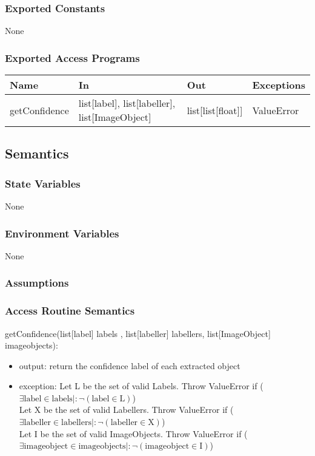 \documentclass[12pt, titlepage]{article}
\begin{document}
  
  \subsubsection{Exported Constants}
  None
  \subsubsection{Exported Access Programs}
  
  \begin{center}
  \begin{tabular}{p{2cm} p{4cm} p{4cm} p{2cm}}
  \hline
  \textbf{Name} & \textbf{In} & \textbf{Out} & \textbf{Exceptions} \\
  \hline
  getConfidence & list[label], list[labeller], list[ImageObject] & list[list[float]]  & ValueError \\
  
  \end{tabular}
  \end{center}
  
  \subsection{Semantics}
  
  \subsubsection{State Variables}
  
 None
  
  \subsubsection{Environment Variables}
  
  None
  
  \subsubsection{Assumptions}
  
  
  \subsubsection{Access Routine Semantics}
  
  \noindent getConfidence(list[label] labels , list[labeller] labellers, list[ImageObject] imageobjects):
  \begin{itemize}
  \item output: return the confidence label of each extracted object
  \item exception: Let L be the set of valid Labels. Throw ValueError if ($\exists \text{label} \in \text{labels} |: \neg (\text{label} \in \text{L})$)\\
  Let X be the set of valid Labellers. Throw ValueError if ($\exists \text{labeller} \in \text{labellers} |: \neg (\text{labeller} \in \text{X})$)\\
  Let I be the set of valid ImageObjects. Throw ValueError if ($\exists \text{imageobject} \in \text{imageobjects} |: \neg (\text{imageobject} \in \text{I})$)\\
  \end{itemize}
\end{document}
